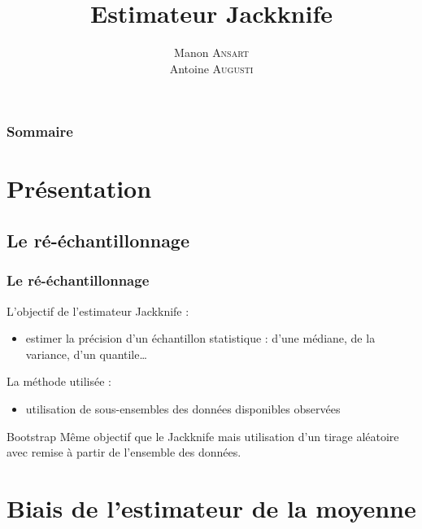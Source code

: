 \documentclass[handout]{beamer}
\title{
	Estimateur Jackknife
}
\author{
	Manon \textsc{Ansart} \\
	\vspace{10px}
	Antoine \textsc{Augusti}
}
\date{}
\begin{document}
	\begin{frame}[plain]
		\titlepage
	\end{frame}

	\begin{frame}[plain]
		\frametitle{Sommaire}
		\tableofcontents
	\end{frame}


	\section{Présentation}

		\subsection{Le ré-échantillonnage}
		\begin{frame}
			\frametitle{Le ré-échantillonnage}

			L'objectif de l'estimateur Jackknife :
			\begin{itemize}
				\item estimer la précision d'un échantillon statistique : d'une médiane, de la variance, d'un quantile\dots
			\end{itemize}

			\vspace{15px}

			La méthode utilisée :
			\begin{itemize}
				\item utilisation de sous-ensembles des données disponibles observées
			\end{itemize}

			\vspace{20px}

			\begin{exampleblock}{Bootstrap}
				Même objectif que le Jackknife mais utilisation d'un tirage aléatoire avec remise à partir de l'ensemble des données.
			\end{exampleblock}
		\end{frame}

	\section{Biais de l'estimateur de la moyenne}
\end{document}

